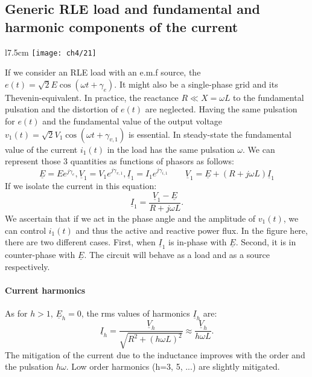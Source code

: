 	\subsection{Generic RLE load and fundamental and harmonic components of the current}
		\begin{wrapfigure}[8]{l}{7.5cm}
			\vspace{-5mm}
			\texttt{[image: ch4/21]}
			\end{wrapfigure}
			If we consider an RLE load with an e.m.f source, the $e(t) = \sqrt{2}E\cos (\omega t + \gamma _e)$. It might also be a single-phase grid and its Thevenin-equivalent. In practice, the reactance $R\ll X = \omega L$ to the fundamental pulsation and the distortion of $e(t)$ are neglected. Having the same pulsation for $e(t)$ and the fundamental value of the output voltage $v_1(t) = \sqrt{2}V_1 \cos (\omega t +\gamma _{v,1})$ is essential. In steady-state the fundamental value of the current $i_1(t)$ in the load has the same pulsation $\omega$. We can represent those 3 quantities as functions of phasors as follows:
			\begin{equation}
				\underline{E} = Ee^{j\gamma _e}, \underline{V}_1 = V_1e^{j\gamma _{v,1}}, \underline{I}_1 = I_1e^{j\gamma _{i,1}} \qquad \underline{V}_1=\underline{E}+(R+j\omega L)\underline{I}_1
			\end{equation}
			If we isolate the current in this equation:
			\begin{equation}
				\underline{I}_1 = \frac{\underline{V}_1-\underline{E}}{R+j\omega L}.
			\end{equation}
			We ascertain that if we act in the phase angle and the amplitude of $v_1(t)$, we can control $i_{1}(t)$ and thus the active and reactive power flux. In the figure here, there are two different cases. First, when $\underline{I}_1$ is in-phase with $\underline{E}$. Second, it is in counter-phase with $\underline{E}$. The circuit will behave as a load and as a source respectively. 
			
			\paragraph{Current harmonics} \quad As for $h>1$, $\underline{E}_h =0$, the rms values of harmonics $\underline{I}_h$ are: 
			\begin{equation}
				\underline{I}_h = \frac{\underline{V}_h}{\sqrt{R^2+(h\omega L)^2}} \approx \frac{\underline{V}_h}{h\omega L}. 
			\end{equation}
			The mitigation of the current due to the inductance improves with the order and the pulsation $h\omega$. Low order harmonics (h=3, 5, ...) are slightly mitigated. 
			
